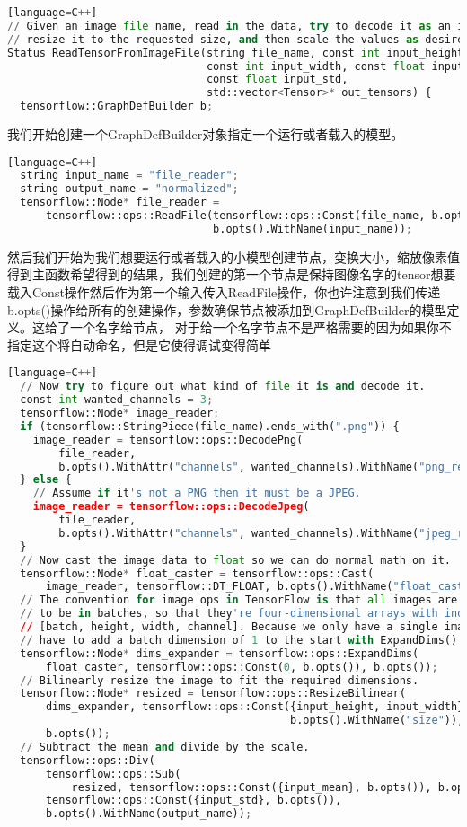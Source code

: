 \begin{lstlisting}[language=Python][language=C++]
// Given an image file name, read in the data, try to decode it as an image,
// resize it to the requested size, and then scale the values as desired.
Status ReadTensorFromImageFile(string file_name, const int input_height,
                               const int input_width, const float input_mean,
                               const float input_std,
                               std::vector<Tensor>* out_tensors) {
  tensorflow::GraphDefBuilder b;
\end{lstlisting}
我们开始创建一个GraphDefBuilder对象指定一个运行或者载入的模型。
\begin{lstlisting}[language=Python][language=C++]
  string input_name = "file_reader";
  string output_name = "normalized";
  tensorflow::Node* file_reader =
      tensorflow::ops::ReadFile(tensorflow::ops::Const(file_name, b.opts()),
                                b.opts().WithName(input_name));
\end{lstlisting}
然后我们开始为我们想要运行或者载入的小模型创建节点，变换大小，缩放像素值得到主函数希望得到的结果，我们创建的第一个节点是保持图像名字的tensor想要载入Const操作然后作为第一个输入传入ReadFile操作，你也许注意到我们传递b.opts()操作给所有的创建操作，参数确保节点被添加到GraphDefBuilder的模型定义。这给了一个名字给节点，
对于给一个名字节点不是严格需要的因为如果你不指定这个将自动命名，但是它使得调试变得简单
\begin{lstlisting}[language=Python][language=C++]
  // Now try to figure out what kind of file it is and decode it.
  const int wanted_channels = 3;
  tensorflow::Node* image_reader;
  if (tensorflow::StringPiece(file_name).ends_with(".png")) {
    image_reader = tensorflow::ops::DecodePng(
        file_reader,
        b.opts().WithAttr("channels", wanted_channels).WithName("png_reader"));
  } else {
    // Assume if it's not a PNG then it must be a JPEG.
    image_reader = tensorflow::ops::DecodeJpeg(
        file_reader,
        b.opts().WithAttr("channels", wanted_channels).WithName("jpeg_reader"));
  }
  // Now cast the image data to float so we can do normal math on it.
  tensorflow::Node* float_caster = tensorflow::ops::Cast(
      image_reader, tensorflow::DT_FLOAT, b.opts().WithName("float_caster"));
  // The convention for image ops in TensorFlow is that all images are expected
  // to be in batches, so that they're four-dimensional arrays with indices of
  // [batch, height, width, channel]. Because we only have a single image, we
  // have to add a batch dimension of 1 to the start with ExpandDims().
  tensorflow::Node* dims_expander = tensorflow::ops::ExpandDims(
      float_caster, tensorflow::ops::Const(0, b.opts()), b.opts());
  // Bilinearly resize the image to fit the required dimensions.
  tensorflow::Node* resized = tensorflow::ops::ResizeBilinear(
      dims_expander, tensorflow::ops::Const({input_height, input_width},
                                            b.opts().WithName("size")),
      b.opts());
  // Subtract the mean and divide by the scale.
  tensorflow::ops::Div(
      tensorflow::ops::Sub(
          resized, tensorflow::ops::Const({input_mean}, b.opts()), b.opts()),
      tensorflow::ops::Const({input_std}, b.opts()),
      b.opts().WithName(output_name));
\end{lstlisting}
